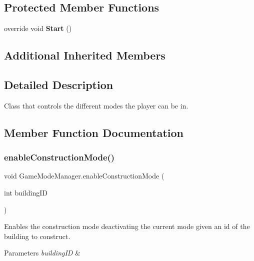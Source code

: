 \subsection*{Protected Member Functions}
\begin{DoxyCompactItemize}
\item 
\mbox{\label{class_game_mode_manager_a75bfbf0bdce4d6c65b77852264562711}} 
override void {\bfseries Start} ()
\end{DoxyCompactItemize}
\subsection*{Additional Inherited Members}


\subsection{Detailed Description}
Class that controls the different modes the player can be in. 



\subsection{Member Function Documentation}
\mbox{\label{class_game_mode_manager_a3571ab1df61bc08ade07a49fefac6806}} 
\subsubsection{\texorpdfstring{enable\+Construction\+Mode()}{enableConstructionMode()}}
{\footnotesize\ttfamily void Game\+Mode\+Manager.\+enable\+Construction\+Mode (\begin{DoxyParamCaption}\item[{int}]{building\+ID }\end{DoxyParamCaption})}



Enables the construction mode deactivating the current mode given an id of the building to construct. 


\begin{DoxyParams}{Parameters}
{\em building\+ID} & \\
\hline
\end{DoxyParams}
\mbox{\label{class_game_mode_manager_a593ebd11a47f34970079b487c1ee1903}} 
